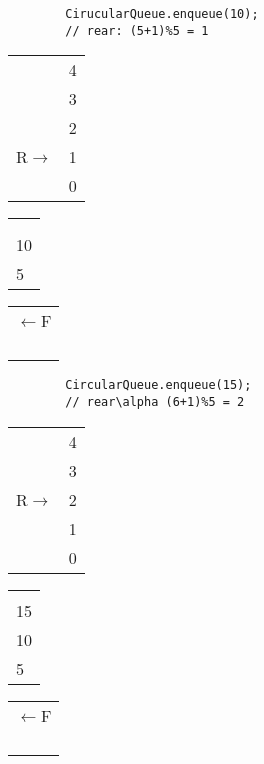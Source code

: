 \begin{center}
    \begin{verbatim}
        CirucularQueue.enqueue(10);
        // rear: (5+1)%5 = 1
    \end{verbatim}

    \begin{tabular}{ cc }
        {}&{4} \\ {}&{3} \\ {}&{2} \\ {R$\rightarrow$}&{1} \\ {}&{0} \\
    \end{tabular}
    \begin{tabular}{|p{0.75cm}|}
        \hline {} \\ \hline {} \\ \hline {} \\ \hline {10} \\ \hline {5} \\ \hline
    \end{tabular}
    \begin{tabular}{ c }
        {$\leftarrow$F} \\ {} \\ {} \\ {} \\ {} \\
    \end{tabular}

    \begin{verbatim}
        CircularQueue.enqueue(15);
        // rear\alpha (6+1)%5 = 2
    \end{verbatim}

    \begin{tabular}{ cc }
        {}&{4} \\ {}&{3} \\ {R$\rightarrow$}&{2} \\ {}&{1} \\ {}&{0} \\
    \end{tabular}
    \begin{tabular}{|p{0.75cm}|}
        \hline {} \\ \hline {} \\ \hline {15} \\ \hline {10} \\ \hline {5} \\ \hline
    \end{tabular}
    \begin{tabular}{ c }
        {$\leftarrow$F} \\ {} \\ {} \\ {} \\ {} \\
    \end{tabular}


\end{center}
